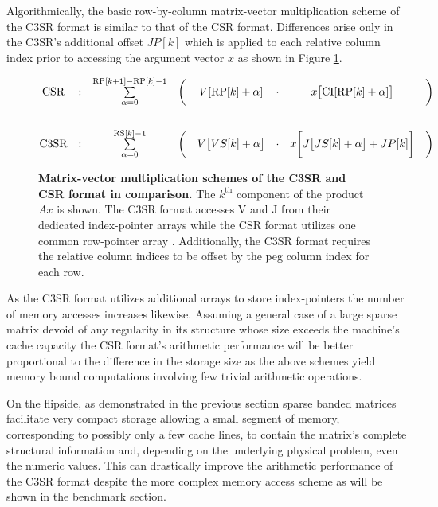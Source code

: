       Algorithmically, the basic row-by-column matrix-vector multiplication scheme of the C3SR format is similar to that of the CSR format. Differences arise only in the C3SR's additional offset $JP[k]$ which is applied to each relative column index prior to accessing the argument vector $x$ as shown in Figure \ref{fig:c3sr_matvecmult_basic}.

      \begin{figure}[ht]
        \centering
        $$
        \begin{matrix}
          \text{CSR}  & : & \sum \limits_{\alpha = 0}^{\RP[k+1] - \RP[k] - 1} & \bigg( & V[\RP[k] + \alpha]   & \cdot & x\big[\CI[\RP[k] + \alpha]\big] & \bigg)\\
          \vspace{0.3cm} \\
          \text{C3SR} & : & \sum \limits_{\alpha = 0}^{\RS[k] - 1} & \bigg( & V\big[VS[k] + \alpha\big] & \cdot & x\bigg[J\big[JS[k] + \alpha\big] + JP[k]\bigg] & \bigg) \\
        \end{matrix}
        $$
        \caption[Matrix-vector multiplication schemes of the C3SR and CSR format in comparison.]{\textbf{Matrix-vector multiplication schemes of the C3SR and CSR format in comparison.} The $k^{\text{th}}$ component of the product $Ax$ is shown. The C3SR format accesses V and J from their dedicated index-pointer arrays while the CSR format utilizes one common row-pointer array \RP. Additionally, the C3SR format requires the relative column indices to be offset by the peg column index for each row.}
        \label{fig:c3sr_matvecmult_basic}
      \end{figure}

      As the C3SR format utilizes additional arrays to store index-pointers the number of memory accesses increases likewise. Assuming a general case of a large sparse matrix devoid of any regularity in its structure whose size exceeds the machine's cache capacity the CSR format's arithmetic performance will be better proportional to the difference in the storage size as the above schemes yield memory bound computations involving few trivial arithmetic operations.

      On the flipside, as demonstrated in the previous section sparse banded matrices facilitate very compact storage allowing a small segment of memory, corresponding to possibly only a few cache lines, to contain the matrix's complete structural information and, depending on the underlying physical problem, even the numeric values. This can drastically improve the arithmetic performance of the C3SR format despite the more complex memory access scheme as will be shown in the benchmark section.


